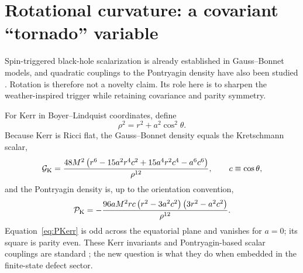 \documentclass[11pt]{article}
\newcommand{\Geff}{\mathcal G}
\newcommand{\Pontryagin}{\mathcal P}
\begin{document}
\section{Rotational curvature: a covariant ``tornado'' variable}
Spin-triggered black-hole scalarization is already established in Gauss--Bonnet models, and quadratic couplings to the Pontryagin density have also been studied \citep{HerdeiroEtAl2021,DonevaCollodelYazadjiev2022,GaoHuangLiu2019}.  Rotation is therefore not a novelty claim.  Its role here is to sharpen the weather-inspired trigger while retaining covariance and parity symmetry.

For Kerr in Boyer--Lindquist coordinates, define
\begin{equation}
\rho^2=r^2+a^2\cos^2\theta.
\end{equation}
Because Kerr is Ricci flat, the Gauss--Bonnet density equals the Kretschmann scalar,
\begin{equation}
\Geff_{\rm K}=
\frac{48M^2\left(r^6-15a^2r^4c^2+15a^4r^2c^4-a^6c^6\right)}{\rho^{12}},
\qquad c\equiv\cos\theta,
\label{eq:GKerr}
\end{equation}
and the Pontryagin density is, up to the orientation convention,
\begin{equation}
\Pontryagin_{\rm K}=
-\frac{96aM^2rc\left(r^2-3a^2c^2\right)\left(3r^2-a^2c^2\right)}{\rho^{12}}.
\label{eq:PKerr}
\end{equation}
Equation~\eqref{eq:PKerr} is odd across the equatorial plane and vanishes for $a=0$; its square is parity even.  These Kerr invariants and Pontryagin-based scalar couplings are standard \citep{GaoHuangLiu2019,ZhouChenJing2021}; the new question is what they do when embedded in the finite-state defect sector.
\end{document}
